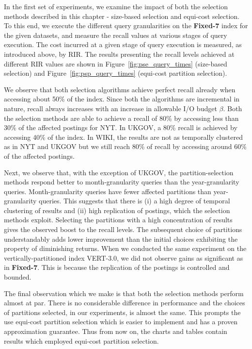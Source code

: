In the first set of experiments, we examine the impact of both the selection methods described in this chapter - size-based selection and equi-cost selection. To this end, we execute the different query granularities on the \textbf{Fixed-7} index for the given datasets, and measure the recall values at various stages of query execution. The cost incurred at a given stage of query execution is measured, as introduced above, by RIR. The results presenting the recall levels achieved at different RIR values are shown in Figure~\ref{fig:pse_query_times} (size-based selection) and Figure~\ref{fig:psp_query_times} (equi-cost partition selection).

We observe that both selection algorithms achieve perfect recall already when accessing about 50\% of the index. Since both the algorithms are incremental in nature, recall always increases with an increase in allowable I/O budget $\beta$. Both the selection methods are able to achieve a recall of 80\% by accessing less than 30\% of the affected postings for NYT. In UKGOV, a 80\% recall is achieved by accessing 40\% of the index. In WIKI, the results are not as temporally clustered as in NYT and UKGOV but we still reach 80\% of recall by accessing around 60\% of the affected postings. 

Next, we observe that, with the exception of UKGOV, the partition-selection methods respond better to month-granularity queries than the year-granularity queries. Month-granularity queries have fewer affected partitions than year-granularity queries. This suggests that there is (i) a high degree of temporal clustering of results and (ii) high replication of postings, which the selection methods exploit. Selecting the partitions with a high concentration of results gives the observed boost to the recall levels. The subsequent choice of partitions understandably adds lower improvement than the initial choices exhibiting the property of diminishing returns. When we conducted the same experiment on the vertically-partitioned index VERT-3.0, we did not observe gains as significant as in \textbf{Fixed-7}. This is because the replication of the postings is controlled and bounded. 

The final observation which we make is that both the selection methods perform almost at par. There is no considerable difference in performance and the choices of partitions selected, in our experiments, is almost the same. This prompts the use equi-cost partition selection which is easier to implement and has a proven approximation guarantee. Thus from now on, the charts and tables contain results which employed equi-cost partition selection.

